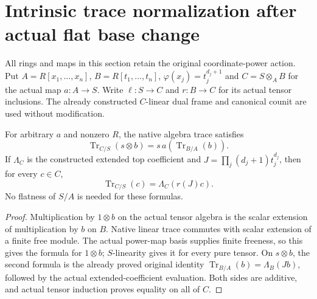 \section{Intrinsic trace normalization after actual flat base change}
\label{sec:kn-nadel-kummer-trace-base-change-uniqueness}

All rings and maps in this section retain the original coordinate-power
action.  Put $A=R[x_1,\ldots,x_n]$, $B=R[t_1,\ldots,t_n]$,
$\varphi(x_j)=t_j^{d_j+1}$ and $C=S\otimes_{A}B$ for the actual map
$a:A\to S$.  Write $\ell:S\to C$ and $r:B\to C$ for its actual
tensor inclusions.  The already constructed $C$-linear dual frame and
canonical counit are used without modification.

\begin{lemma}
\label{lem:kn-nadel-tensor-trace-normalization}
\leanok
For arbitrary $a$ and nonzero $R$, the native algebra trace satisfies
\[
 \operatorname{Tr}_{C/S}(s\otimes b)
   =s\,a(\operatorname{Tr}_{B/A}(b)).
\]
If $\Lambda_C$ is the constructed extended top coefficient and
$J=\prod_j(d_j+1)t_j^{d_j}$, then for every $c\in C$,
\[
 \operatorname{Tr}_{C/S}(c)=\Lambda_C(r(J)c).
\]
No flatness of $S/A$ is needed for these formulas.
\end{lemma}
\begin{proof}
Multiplication by $1\otimes b$ on the actual tensor algebra is the
scalar extension of multiplication by $b$ on $B$.  Native linear trace
commutes with scalar extension of a finite free module.  The actual
power-map basis supplies finite freeness, so this gives the formula
for $1\otimes b$; $S$-linearity gives it for every pure tensor.
On $s\otimes b$, the second formula is the already proved original
identity $\operatorname{Tr}_{B/A}(b)=\Lambda_B(Jb)$, followed by the
actual extended-coefficient evaluation.  Both sides are additive,
and actual tensor induction proves equality on all of $C$.
\end{proof}

